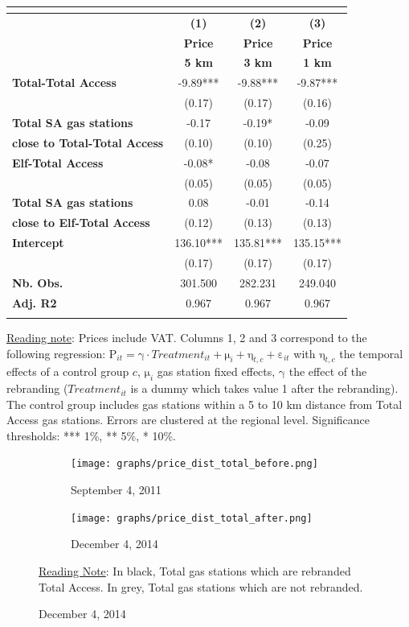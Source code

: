 \documentclass[english]{article}
\begin{document}
\begin{center}
\begin{footnotesize} %
\begin{tabular}{l|ccc}
\multicolumn{1}{l}{} &  &  & \tabularnewline
\hline
\hline
 & \textbf{(1)}  & \textbf{(2)}  & \textbf{(3)}\tabularnewline
 & \textbf{Price}  & \textbf{Price}  & \textbf{Price}\tabularnewline
 & \textbf{5 km}  & \textbf{3 km}  & \textbf{1 km}\tabularnewline
\hline
\textbf{Total-Total Access}  & -9.89{*}{*}{*}  & -9.88{*}{*}{*}  & -9.87{*}{*}{*}\tabularnewline
 & (0.17)  & (0.17)  & (0.16) \tabularnewline
\textbf{Total SA gas stations}  & -0.17  & -0.19{*}  & -0.09\tabularnewline
\textbf{close to Total-Total Access}  & (0.10)  & (0.10)  & (0.25)\tabularnewline
\hline
\textbf{Elf-Total Access}  & -0.08{*}  & -0.08  & -0.07\tabularnewline
 & (0.05)  & (0.05)  & (0.05)\tabularnewline
\textbf{Total SA gas stations}  & 0.08  & -0.01  & -0.14\tabularnewline
\textbf{close to Elf-Total Access}  & (0.12)  & (0.13)  & (0.13)\tabularnewline
\hline
\textbf{Intercept}  & 136.10{*}{*}{*}  & 135.81{*}{*}{*}  & 135.15{*}{*}{*}\tabularnewline
 & (0.17)  & (0.17)  & (0.17)\tabularnewline
\hline
\textbf{Nb. Obs.}  & 301.500  & 282.231  & 249.040\tabularnewline
\textbf{Adj. R2}  & 0.967  & 0.967  & 0.967\tabularnewline
\hline
\hline
\multicolumn{1}{l}{} &  &  & \tabularnewline
\end{tabular}\end{footnotesize}
\par\end{center}

{\small{}\uline{Reading note}}{\small{}: } Prices include VAT. Columns 1, 2 and 3 correspond to the following regression: $\mathrm{P}_{it}=\mathrm{\gamma}\cdot Treatment_{it}+\mathrm{\mu}_{i}+\mathrm{\eta}_{t,c}+\mathrm{\varepsilon}_{it}$ with $\mathrm{\eta}_{t,c}$ the temporal effects of a control group $c$, $\mathrm{\mu}_{i}$ gas station fixed effects, $\mathrm{\gamma}$ the effect of the rebranding ($Treatment_{it}$ is a dummy which takes value 1 after the rebranding). The control group includes gas stations within a 5 to 10 km distance from Total Access gas stations. Errors are clustered at the regional level. Significance thresholds: {*}{*}{*} 1\%, {*}{*} 5\%, {*} 10\%.\medskip{}

\begin{figure}[H]
\centering
\caption{Distributions of Total prices before and after rebranding}
\label{fig:price_dist_total_ba}
\begin{subfigure}[t]{.49\columnwidth}
\centering
\texttt{[image: graphs/price\_dist\_total\_before.png]}
\caption[short]{September 4, 2011}
\end{subfigure}
\begin{subfigure}[t]{.49\columnwidth}
\centering
\texttt{[image: graphs/price\_dist\_total\_after.png]}
\caption[short]{December 4, 2014}
\end{subfigure}
\flushleft
{\small{}\uline{Reading Note}}{\small{}: In black, Total gas stations which are rebranded Total Access. In grey, Total gas stations which are not rebranded.}{\small \par}
\end{figure}
\end{document}

